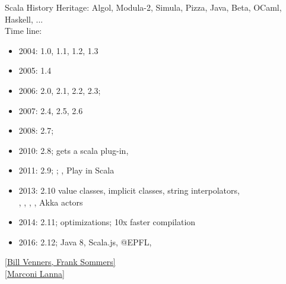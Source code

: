 \documentclass{lecturenotes}
\begin{document}
\begin{Slide}{Scala History}\fontsize{9}{11}\selectfont
Heritage: Algol, Modula-2, Simula, Pizza, Java, Beta, OCaml, Haskell, ...\\ Time line:
\begin{itemize}
\item 2004: 1.0, 1.1, 1.2, 1.3
\item 2005: 1.4
\item 2006: 2.0, 2.1, 2.2, 2.3; 
\item 2007: 2.4, 2.5, 2.6
\item 2008: 2.7; 
\item 2010: 2.8;  gets a scala plug-in, 
\item 2011: 2.9; ; , Play in Scala
\item 2013: 2.10 value classes, implicit classes, string interpolators, \\ , , , , Akka actors
\item 2014: 2.11; optimizations; 10x faster compilation
\item 2016: 2.12; Java 8, Scala.js, @EPFL, 
\end{itemize}
\href{https://www.artima.com/scalazine/articles/origins_of_scala.html}{[Bill Venners, Frank Sommers]} \\
\href{https://speakerdeck.com/marconilanna/what-is-new-since-programming-in-scala}{[Marconi Lanna]}
\end{Slide}
\end{document}
